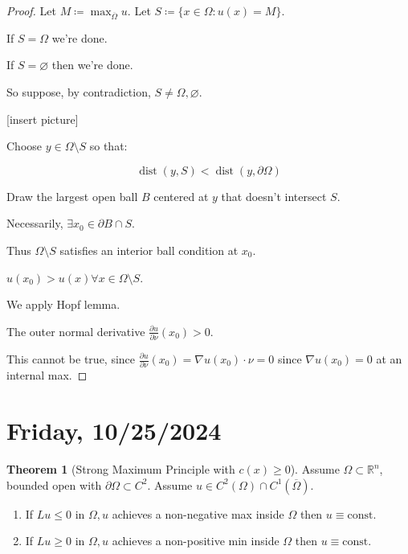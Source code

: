 \documentclass{article}
\theoremstyle{definition}
\newtheorem{theorem}{Theorem}
\begin{document}
\begin{proof}
    Let \(M \coloneqq \max_{\overline{\Omega}} u\). Let \(S \coloneqq \{ x\in \Omega : u(x) = M \}\).
    
    If \(S = \Omega\) we're done.

    If \(S = \varnothing\) then we're done.

    So suppose, by contradiction, \(S \neq \Omega , \varnothing\).

    [insert picture]

    Choose \(y \in \Omega \setminus S\) so that:

    \[
        \operatorname{dist}(y,S) < \operatorname{dist}(y, \partial \Omega)
    \]

    Draw the largest open ball \(B\)  centered at \(y\) that doesn't intersect \(S\).

    Necessarily, \(\exists x_0 \in \partial B \cap S\).

    Thus \(\Omega \setminus S\) satisfies an interior ball condition at \(x_0\).

    \(u(x_0) > u(x) \forall x\in \Omega \setminus S\).

    We apply Hopf lemma.

    The outer normal derivative \(\frac{\partial u}{\partial \nu} (x_0) > 0\).

    This cannot be true, since \(\frac{\partial u}{\partial \nu} (x_0) = \nabla u(x_0) \cdot \nu = 0\) since \(\nabla u(x_0) = 0\) at an internal max.
\end{proof}

\section*{Friday, 10/25/2024}

\begin{theorem}
    [Strong Maximum Principle with \(c(x) \geq 0\)]

    Assume \(\Omega \subset \mathbb{R} ^ n\), bounded open with \(\partial \Omega \subset C^2\). Assume \(u\in C^2(\Omega)\cap C^1(\overline{\Omega})\).

    \begin{enumerate}[label=\roman*)]
        \item If \(Lu \leq 0\) in \(\Omega, u\) achieves a non-negative max inside \(\Omega\) then \(u\equiv \text{const}\).
        \item If \(Lu \geq 0\) in \(\Omega, u\) achieves a non-positive min inside \(\Omega\) then \(u\equiv \text{const}\).
    \end{enumerate} 
\end{theorem}
\end{document}
